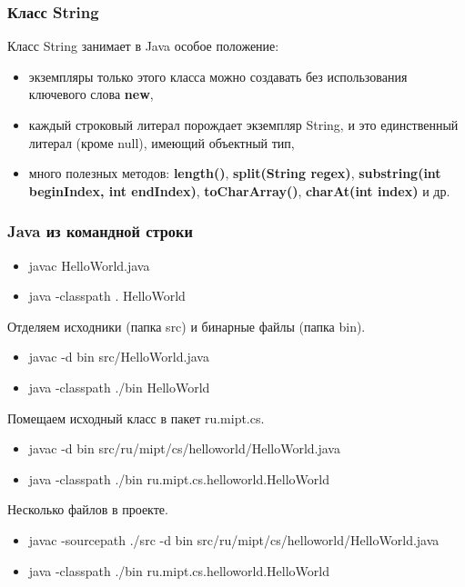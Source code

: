 \documentclass[default]{beamer}
\begin{document}

	\begin{frame}
		\frametitle{Класс String}
		
		Класс String занимает в Java особое положение:
		
		\begin{itemize}
			\item экземпляры только этого класса можно создавать без использования ключевого слова \textbf{new},
			\item каждый строковый литерал порождает экземпляр String, и это единственный литерал (кроме null), имеющий объектный тип,
			\item много полезных методов: \textbf{length()}, \textbf{split(String regex)}, \textbf{substring(int beginIndex, int endIndex)}, \textbf{toCharArray()}, \textbf{charAt(int index)} и др.
		\end{itemize}
		\lstString
	\end{frame}

	\begin{frame}
		\frametitle{Java из командной строки}
		
		\begin{itemize}
			\item javac HelloWorld.java
			\item java -classpath . HelloWorld
		\end{itemize}
		
		Отделяем исходники (папка src) и бинарные файлы (папка bin).
		\begin{itemize}
			\item javac -d bin src/HelloWorld.java
			\item java -classpath ./bin HelloWorld
		\end{itemize}
		
		Помещаем исходный класс в пакет ru.mipt.cs.
		\begin{itemize}
			\item javac -d bin src/ru/mipt/cs/helloworld/HelloWorld.java
			\item java -classpath ./bin ru.mipt.cs.helloworld.HelloWorld
		\end{itemize}				
		
		Несколько файлов в проекте.		
		\begin{itemize}
			\item javac -sourcepath ./src -d bin src/ru/mipt/cs/helloworld/HelloWorld.java
			\item java -classpath ./bin ru.mipt.cs.helloworld.HelloWorld
		\end{itemize}				
	\end{frame}
	
	
\end{document}

